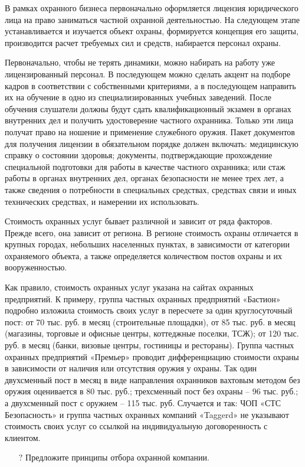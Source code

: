 \documentclass[a4paper,12pt,fleqn]{article} %
\begin{document}
В рамках охранного бизнеса первоначально оформляется лицензия юридического лица на право заниматься частной охранной деятельностью. На следующем этапе устанавливается и изучается объект охраны, формируется концепция его защиты, производится расчет требуемых сил и средств, набирается персонал охраны.

Первоначально, чтобы не терять динамики, можно набирать на работу уже лицензированный персонал. В последующем можно сделать акцент на подборе кадров в соответствии с собственными критериями, а в последующем направить их на обучение в одно из специализированных учебных заведений. После обучения слушатели должны будут сдать квалификационный экзамен в органах внутренних дел и получить удостоверение частного охранника. Только эти лица получат право на ношение и применение служебного оружия. Пакет документов для получения лицензии в обязательном порядке должен включать: медицинскую справку о состоянии здоровья; документы, подтверждающие прохождение специальной подготовки для работы в качестве частного охранника; или стаж работы в органах внутренних дел, органах безопасности не менее трех лет, а также сведения о потребности в специальных средствах, средствах связи и иных технических средствах, и намерении их использовать.

Стоимость охранных услуг бывает различной и зависит от ряда факторов. Прежде всего, она зависит от региона. В регионе стоимость охраны отличается в крупных городах, небольших населенных пунктах, в зависимости от категории охраняемого объекта, а также определяется количеством постов охраны и их вооруженностью.\\

\begin{tcolorbox}[colback=blue!55!red!5!,colframe=blue!55!red,enforce breakable,%
	pad at break=1mm, title=Кейс 32. Стоимость охранных услуг]
	
	Как правило, стоимость охранных услуг указана на сайтах охранных предприятий. К примеру, группа частных охранных предприятий «Бастион» подробно изложила стоимость своих услуг в пересчете за один круглосуточный пост: от 70 тыс. руб. в месяц (строительные площадки), от 85 тыс. руб. в месяц (магазины, торговые и офисные центры, коттеджные поселки, ТСЖ); от 120 тыс. руб. в месяц (банки, визовые центры, гостиницы и рестораны). Группа частных охранных предприятий «Премьер» проводит дифференциацию стоимости охраны в зависимости от наличия или отсутствия оружия у охраны. Так один двухсменный пост в месяц в виде направления охранников вахтовым методом без оружия оценивается в 80 тыс. руб.; трехсменный пост без охраны – 96 тыс. руб.; а двухсменный пост с оружием – 115 тыс. руб. Случается и так: ЧОП «СТС Безопасность» и группа частных охранных компаний «Taggerd» не указывают стоимость своих услуг со ссылкой на индивидуальную договоренность с клиентом.	
	
	\begin{itemize}
		\item[{\color{blue!55!red}\Huge {  $ ? $}} \quad]   Предложите принципы отбора охранной компании.
	\end{itemize}	
	
\end{tcolorbox}
\end{document}
